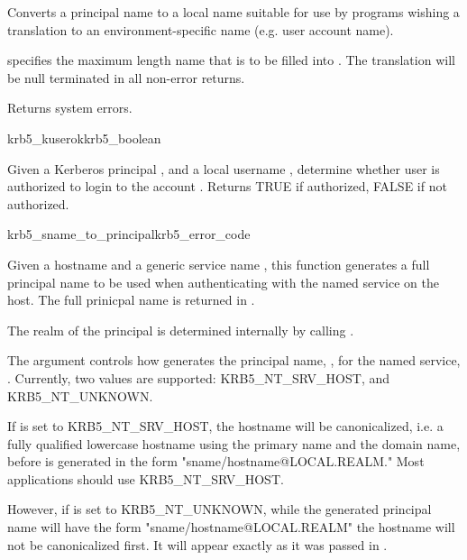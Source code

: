 Converts a principal name  to a local name suitable for use by
programs wishing a translation to an environment-specific name (e.g.
user account name).

 specifies the maximum length name that is to be filled into
.
The translation will be null terminated in all non-error returns.

Returns system errors.

\begin{funcdecl}{krb5_kuserok}{krb5_boolean}{\funcin}
\end{funcdecl}

Given a Kerberos principal , and a local username
,
determine whether user is authorized to login to the account .
Returns TRUE if authorized, FALSE if not authorized.

\begin{funcdecl}{krb5_sname_to_principal}{krb5_error_code}{\funcin}
\funcout
{}
\end{funcdecl}

Given a hostname  and a generic service name
, this function generates a full principal name to be
used when authenticating with the named service on the host.  The full
prinicpal name is  returned  in .

The realm of the
principal is determined internally by calling .

The  argument controls how
 generates the principal name,
, for the named service, .
Currently, two values   are supported: KRB5_NT_SRV_HOST, and
KRB5_NT_UNKNOWN.  

If  is set to
KRB5_NT_SRV_HOST, the hostname will be
canonicalized, i.e. a fully qualified lowercase hostname using
the primary name and the domain name, before  is
generated in the form
"sname/hostname@LOCAL.REALM." Most applications should use
KRB5_NT_SRV_HOST.  

However, if  is set to KRB5_NT_UNKNOWN,
while the generated principal name will have    the form
"sname/hostname@LOCAL.REALM" the hostname will not be canonicalized
first.  It will appear exactly as it was passed in .  

